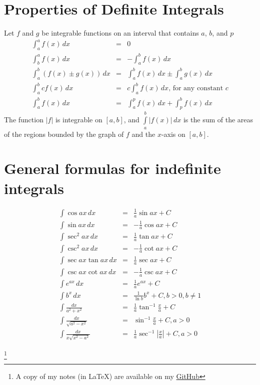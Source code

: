 \documentclass{article}
\newcommand\blfootnote[1]{
    \begingroup
    \renewcommand\thefootnote{}\footnote{#1}
    \addtocounter{footnote}{-1}
    \endgroup
}
\begin{document}
\section*{Properties of Definite Integrals}
Let $f$ and $g$ be integrable functions on an interval that contains $a$, $b$, and $p$
\begin{eqnarray}
    \int_a^a{f(x)\,dx} &=& 0 \\
    \int_b^a{f(x)\,dx} &=& -\int_a^b{f(x)\,dx} \\
    \int_a^b{\left(f(x) \pm g(x)\right)\,dx} &=& \int_a^b{f(x)\,dx} \pm \int_a^b{g(x)\,dx} \\
    \int_a^b{cf(x)\,dx} &=& c\int_a^b{f(x)\,dx}\text{, for any constant } c \\
    \int_a^b{f(x)\,dx} &=& \int_a^p{f(x)\,dx} + \int_p^b{f(x)\,dx}
\end{eqnarray}
\hspace{0.5cm} The function $|f|$ is integrable on $[a,b]$, and $\int\limits_a^b{|f(x)|\,dx}$ is the sum of the areas of the regions bounded by the graph of $f$ and the $x$-axis on $[a,b]$.

\section*{General formulas for indefinite integrals}
\begin{eqnarray}
    \int{\cos{ax}\,dx} &=& \frac{1}{a}\sin{ax} + C \\
    \int{\sin{ax}\,dx} &=& -\frac{1}{a}\cos{ax} + C \\
    \int{\sec^2{ax}\,dx} &=& \frac{1}{a}\tan{ax} + C \\
    \int{\csc^2{ax}\,dx} &=& -\frac{1}{a}\cot{ax} + C \\
    \int{\sec{ax}\tan{ax}\,dx} &=& \frac{1}{a}\sec{ax} + C \\
    \int{\csc{ax}\cot{ax}\,dx} &=& -\frac{1}{a}\csc{ax} + C \\
    \int{e^{ax}\,dx} &=& \frac{1}{a}e^{ax} + C \\
    \int{b^x\,dx} &=& \frac{1}{\ln{b}}b^x + C, b > 0, b \neq 1 \\
    \int{\frac{dx}{a^2 + x^2}} &=& \frac{1}{a}\tan^{-1}{\frac{x}{a}} + C \\
    \int{\frac{dx}{\sqrt{a^2 - x^2}}} &=& \sin^{-1}{\frac{x}{a}} + C, a > 0 \\
    \int{\frac{dx}{x\sqrt{x^2 - a^2}}} &=& \frac{1}{a}\sec^{-1}{\left|\frac{x}{a}\right|} + C, a > 0
\end{eqnarray}

\blfootnote{A copy of my notes (in \LaTeX) are available on my \href{https://github.com/onlinechronically/MATH-211}{GitHub}}
\end{document}
